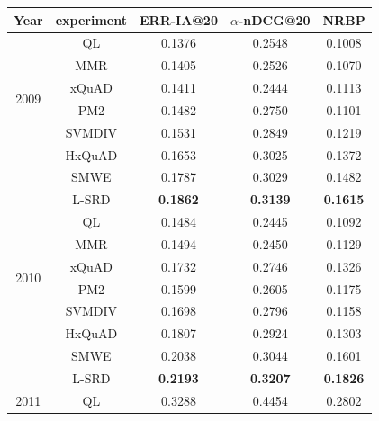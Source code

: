 \documentclass[review]{elsarticle}
\begin{document}
\begin{table}[!htb]
\centering
\begin{tabular}{|c|c|c|c|c|}
\hline
Year & experiment & ERR-IA@20 & $\alpha$-nDCG@20 & NRBP \\%
\hline
\multirow{6}{*}{2009}          & QL     & 0.1376          & 0.2548          & 0.1008          \\
					           & MMR    & 0.1405          & 0.2526          & 0.1070          \\
	                           & xQuAD  & 0.1411          & 0.2444          & 0.1113          \\
	                           & PM2    & 0.1482          & 0.2750          & 0.1101          \\
							   & SVMDIV & 0.1531          & 0.2849          & 0.1219          \\
							   & HxQuAD & 0.1653          & 0.3025          & 0.1372          \\
							   & SMWE   &  0.1787         & 0.3029          & 0.1482          \\
                               & L-SRD  & \textbf{0.1862} & \textbf{0.3139} & \textbf{0.1615} \\
\hline            
\multirow{6}{*}{2010}          & QL     & 0.1484          & 0.2445          & 0.1092          \\
	                           & MMR    & 0.1494          & 0.2450          & 0.1129          \\
	                           & xQuAD  & 0.1732          & 0.2746          & 0.1326          \\
                               & PM2    & 0.1599          & 0.2605          & 0.1175          \\
							   & SVMDIV & 0.1698          & 0.2796          & 0.1158          \\
							   & HxQuAD & 0.1807          & 0.2924          &  0.1303         \\
							   & SMWE   & 0.2038          &  0.3044          & 0.1601         \\
                               & L-SRD  & \textbf{0.2193} & \textbf{0.3207} & \textbf{0.1826} \\
\hline
\multirow{6}{*}{2011}          & QL     & 0.3288          & 0.4454          & 0.2802          \\

\end{tabular}
\end{table}
\end{document}

